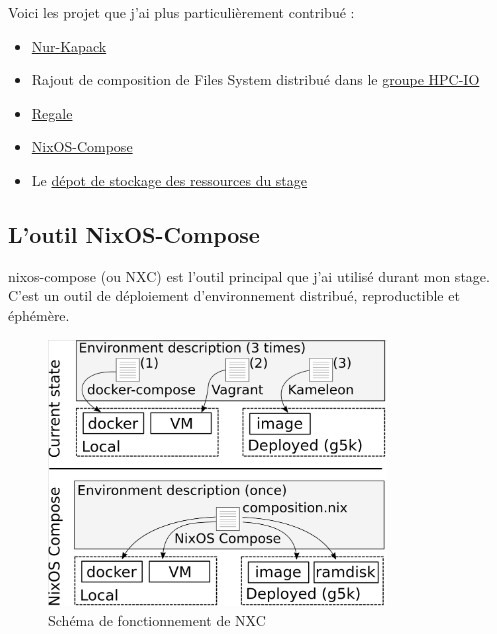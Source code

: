 \documentclass[a4paper,french,12pt, titlepage]{article}
\begin{document}
Voici les projet que j'ai plus particulièrement contribué :

\begin{itemize}
\item
  \href{https://github.com/oar-team/nur-kapack}{Nur-Kapack}
\item
  Rajout de composition de Files System distribué dans le
  \href{https://gitlab.inria.fr/nixos-compose/hpc-io}{groupe HPC-IO}
\item
  \href{https://gricad-gitlab.univ-grenoble-alpes.fr/regale/tools/regale-nixos-compose}{Regale}
\item
  \href{https://gitlab.inria.fr/nixos-compose/nixos-compose}{NixOS-Compose}
\item
  Le \href{https://gitlab.inria.fr/nixos-compose/stages/alithaud}{dépot
  de stockage des ressources du stage}
\end{itemize}

\newpage

\hypertarget{loutil-nixos-compose}{%
\subsection{L'outil NixOS-Compose}\label{loutil-nixos-compose}}

\Gls{nixos-compose} (ou NXC) est l'outil principal que j'ai utilisé
durant mon stage. C'est un outil de déploiement d'environnement
distribué, reproductible et éphémère.\newline

\begin{figure}[h]
\centering
\includegraphics[width=0.8\textwidth,height=0.8\textheight,keepaspectratio]{images/shema-nxc.png}
\caption{Schéma de fonctionnement de NXC}
\end{figure}
\end{document}

